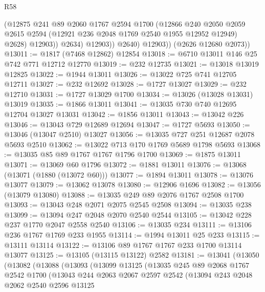 \begin{lexlean}{R58}
\begin{coremodule}
                    (@12875
                      @241
                      @89
                      @2060
                      @1767
                      @2594
                      @1700
                      (@12866
                        @240
                        @2050
                        @2059
                        @2615
                        @2594
                        (@12921 @236 @2048 @1769 @2540 @1955 @12952 @12949)
                        @2628)
                      @12903))
                  @2634)
                @12903))
            @2640)
          @12903))
      (@2626 @12680 @2073))
@13011 := @1817 (@7468 @12862) @12854
@13018 := @6710 @13011 @146 @25 @742 @771 @12712 @12770
@13019 := @232 @12735
@13021 := @13018 @13019 @12825
@13022 := @1944 @13011
@13026 := @13022 @725 @741 @12705 @12711
@13027 := @232 @12692
@13028 := @1727 @13027
@13029 := @232 @12710
@13031 := @1727 @13029 @1700
@13034 := @13026 (@13028 @13031) @13019
@13035 := @1866 @13011
@13041 := @13035 @730 @740 @12695 @12704 @13027 @13031
@13042 := @1856 @13011
@13043 := @13042 @226
@13046 := @13043 @729 @12689 @12694
@13047 := @1727 @5693
@13050 := @13046 (@13047 @2510) @13027
@13056 := @13035 @727 @251 @12687 @2078 @5693 @2510
@13062 := @13022 @713 @170 @1769 @5689 @1798 @5693
@13068 := @13035 @85 @89 @1767 @1767 @1796 @1700
@13069 := @1875 @13011
@13071 := @13069 @60 @1796
@13072 := @1881 @13011
@13076 := @13068 (@13071 (@1880 (@13072 @60)))
@13077 := @1894 @13011
@13078 := @13076 @13077
@13079 := @13062 @13078
@13080 := @12906 @1696
@13082 := @13056 (@13079 @13080)
@13088 := @13035 @249 @89 @2076 @1767 @2508 @1700
@13093 := @13043 @248 @2071 @2075 @2545 @2508
@13094 := @13035 @238
@13099 := @13094 @247 @2048 @2070 @2540 @2544
@13105 := @13042 @228 @237 @1770 @2047 @2558 @2540
@13106 := @13035 @234
@13111 := @13106 @236 @1767 @1769 @233 @1955
@13114 := @1994 @13011 @25 @233
@13115 := @13111 @13114
@13122 := @13106 @89 @1767 @1767 @233 @1700 @13114 @13077
@13125 := @13105 (@13115 @13122) @2582
@13181 := @13041
    (@13050
      (@13082
        (@13088
          (@13093
            (@13099
              @13125
              (@13035
                @245
                @89
                @2068
                @1767
                @2542
                @1700
                (@13043
                  @244
                  @2063
                  @2067
                  @2597
                  @2542
                  (@13094
                    @243
                    @2048
                    @2062
                    @2540
                    @2596
                    @13125

\end{coremodule}
\end{lexlean}
